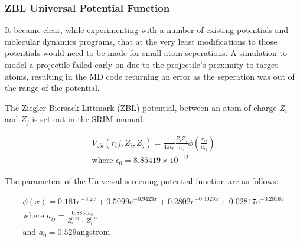 \FloatBarrier
\subsubsection{ZBL Universal Potential Function}

It became clear, while experimenting with a number of existing potentials and molecular dynamics programs, that at the very least modifications to those potentials would need to be made for small atom seperations.  A simulation to model a projectile failed early on due to the projectile's proximity to target atoms, resulting in the MD code returning an error as the seperation was out of the range of the potential.

The Ziegler Biersack Littmark (ZBL) potential, between an atom of charge $Z_i$ and $Z_j$ is set out in the SRIM manual\cite{srimbook}.


\begin{equation}
\begin{split}
V_{zbl}(r_ij, Z_i, Z_j) = \frac{1}{4 \pi \epsilon_0} \frac{Z_i Z_j}{r_{ij}} \phi \left( \frac{r_{ij}}{a_{ij}} \right) \\
\text{where } \epsilon_0 = 8.85419\times 10^{-12} 
\end{split}
\label{eq:eqLennardJones}
\end{equation}

The parameters of the Universal screening potential function are as follows:

\begin{equation}
\begin{split}
\phi(x) = 0.181 e^{-3.2x} + 0.5099 e^{-0.9423x} + 0.2802 e^{-0.4029x} + 0.02817 e^{-0.2016x} \\
\text{where } a_{ij} = \frac{0.8854 a_0}{Z^{0.23}_i + Z^{0.23}_j} \\
\text{and } a_0 = 0.529 \text{angstrom}
\end{split}
\label{eq:screeningPotential}
\end{equation}


